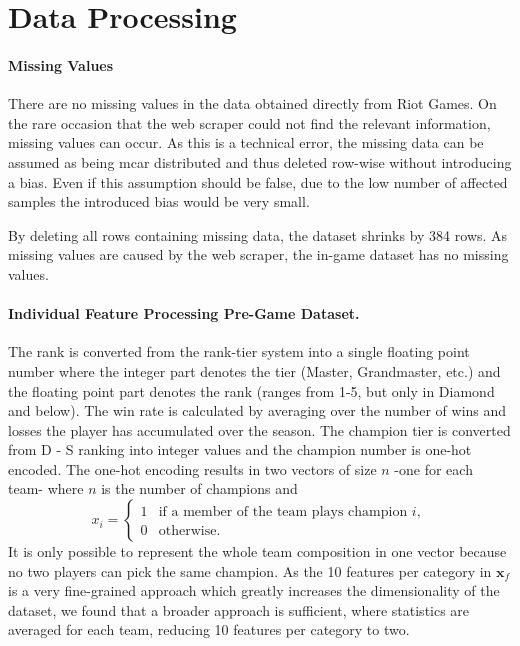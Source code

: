 \documentclass[12pt, a4paper, headinclude, twoside, plainheadsepline, open=right, numbers=noenddot, hidelinks, toc=listof, toc=bibliography]{scrreprt}
\begin{document}
\section{Data Processing}
\label{sec:data_processing}

\paragraph{Missing Values}
There are no missing values in the data obtained directly from Riot Games.
On the rare occasion that the web scraper could not find the relevant information, missing values can occur.
As this is a technical error, the missing data can be assumed as being \ac{mcar} distributed \cite{acockWorkingMissingValues2005} and thus deleted row-wise without introducing a bias.
Even if this assumption should be false, due to the low number of affected samples the introduced bias would be very small.

By deleting all rows containing missing data, the dataset shrinks by 384 rows.
As missing values are caused by the web scraper, the in-game dataset has no missing values.

\paragraph{Individual Feature Processing Pre-Game Dataset.}
The rank is converted from the rank-tier system into a single floating point number where the integer part denotes the tier (Master, Grandmaster, etc.) and the floating point part denotes the rank (ranges from 1-5, but only in Diamond and below).
The win rate is calculated by averaging over the number of wins and losses the player has accumulated over the season.
The champion tier is converted from D - S ranking into integer values and the champion number is one-hot encoded.
The one-hot encoding results in two vectors of size $n$ -one for each team- where $n$ is the number of champions and 
\begin{equation*}
x_i = 
\begin{cases}
	1 & \text{if a member of the team plays champion } i, \\
	0 & \text{otherwise}.
\end{cases}
\end{equation*}
It is only possible to represent the whole team composition in one vector because no two players can pick the same champion.
As the 10 features per category in $\mathbf{x}_f$ is a very fine-grained approach which greatly increases the dimensionality of the dataset, 
we found that a broader approach is sufficient, where statistics are averaged for each team, reducing 10 features per category to two.
\end{document}
